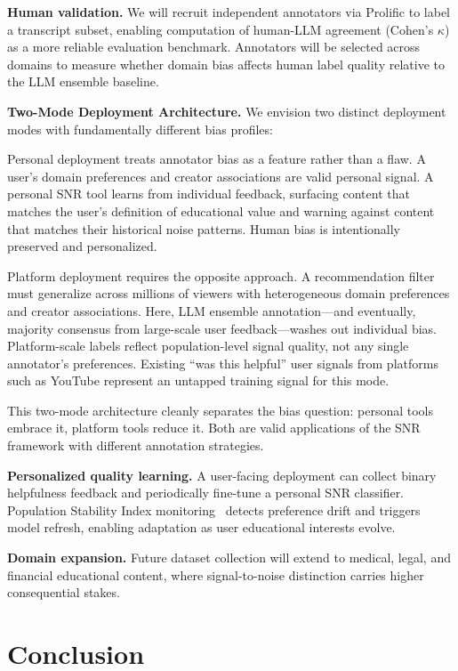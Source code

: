 \documentclass[11pt,a4paper]{article}
\begin{document}
\textbf{Human validation.} We will recruit independent annotators via Prolific to label a
transcript subset, enabling computation of human-LLM agreement (Cohen's $\kappa$) as a more
reliable evaluation benchmark. Annotators will be selected across domains to measure whether
domain bias affects human label quality relative to the LLM ensemble baseline.

\textbf{Two-Mode Deployment Architecture.} We envision two distinct deployment modes with
fundamentally different bias profiles:

Personal deployment treats annotator bias as a feature rather than a flaw. A user's domain
preferences and creator associations are valid personal signal. A personal SNR tool learns from
individual feedback, surfacing content that matches the user's definition of educational value
and warning against content that matches their historical noise patterns. Human bias is
intentionally preserved and personalized.

Platform deployment requires the opposite approach. A recommendation filter must generalize
across millions of viewers with heterogeneous domain preferences and creator associations. Here,
LLM ensemble annotation---and eventually, majority consensus from large-scale user
feedback---washes out individual bias. Platform-scale labels reflect population-level signal
quality, not any single annotator's preferences. Existing ``was this helpful'' user signals from
platforms such as YouTube represent an untapped training signal for this mode.

This two-mode architecture cleanly separates the bias question: personal tools embrace it,
platform tools reduce it. Both are valid applications of the SNR framework with different
annotation strategies.

\textbf{Personalized quality learning.} A user-facing deployment can collect binary helpfulness
feedback and periodically fine-tune a personal SNR classifier. Population Stability Index
monitoring~\cite{yurdakul2018} detects preference drift and triggers model refresh, enabling
adaptation as user educational interests evolve.

\textbf{Domain expansion.} Future dataset collection will extend to medical, legal, and
financial educational content, where signal-to-noise distinction carries higher consequential
stakes.

\section{Conclusion}
\end{document}
